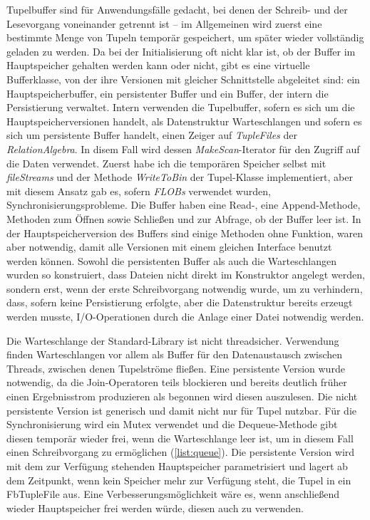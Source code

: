 \documentclass[a4paper,12pt,twoside]{article}
\newcommand{\Fb}[1]{\textit{#1}} %
\begin{document}
Tupelbuffer sind für Anwendungsfälle gedacht, bei denen der Schreib- und der Lesevorgang voneinander getrennt ist -- im Allgemeinen wird zuerst eine bestimmte Menge von Tupeln temporär gespeichert, um später wieder vollständig geladen zu werden. Da bei der Initialisierung oft nicht klar ist, ob der Buffer im Hauptspeicher gehalten werden kann oder nicht, gibt es eine virtuelle Bufferklasse, von der ihre Versionen mit gleicher Schnittstelle abgeleitet sind: ein Hauptspeicherbuffer, ein persistenter Buffer und ein Buffer, der intern die Persistierung verwaltet. Intern verwenden die Tupelbuffer, sofern es sich um die Hauptspeicherversionen handelt, als Datenstruktur Warteschlangen und sofern es sich um persistente Buffer handelt, einen Zeiger auf \Fb{TupleFiles} der \Fb{RelationAlgebra}. In disem Fall wird dessen \Fb{MakeScan}-Iterator für den Zugriff auf die Daten verwendet. Zuerst habe ich die temporären Speicher selbst mit \Fb{fileStreams} und der Methode \Fb{WriteToBin} der Tupel-Klasse implementiert, aber mit diesem Ansatz gab es, sofern \Fb{FLOBs} verwendet wurden, Synchronisierungsprobleme. Die Buffer haben eine Read-, eine Append-Methode, Methoden zum Öffnen sowie Schließen und zur Abfrage, ob der Buffer leer ist. In der Hauptspeicherversion des Buffers sind einige Methoden ohne Funktion, waren aber notwendig, damit alle Versionen mit einem gleichen Interface benutzt werden können. Sowohl die persistenten Buffer als auch die Warteschlangen wurden so konstruiert, dass Dateien nicht direkt im Konstruktor angelegt werden, sondern erst, wenn der erste Schreibvorgang notwendig wurde, um zu verhindern, dass, sofern keine Persistierung erfolgte, aber die Datenstruktur bereits erzeugt werden musste, I/O-Operationen durch die Anlage einer Datei notwendig werden.

Die Warteschlange der Standard-Library ist nicht threadsicher. Verwendung finden Warteschlangen vor allem als Buffer für den Datenaustausch zwischen Threads, zwischen denen Tupelströme fließen. Eine persistente Version wurde notwendig, da die Join-Operatoren teils blockieren und bereits deutlich früher einen Ergebnisstrom produzieren als begonnen wird diesen auszulesen. Die nicht persistente Version ist generisch und damit nicht nur für Tupel nutzbar. Für die Synchronisierung wird ein Mutex verwendet und die Dequeue-Methode gibt diesen temporär wieder frei, wenn die Warteschlange leer ist, um in diesem Fall einen Schreibvorgang zu ermöglichen (\autoref{list:queue}). Die persistente Version wird mit dem zur Verfügung stehenden Hauptspeicher parametrisiert und lagert ab dem Zeitpunkt, wenn kein Speicher mehr zur Verfügung steht, die Tupel in ein Fb{TupleFile} aus. Eine Verbesserungsmöglichkeit wäre es, wenn anschließend wieder Hauptspeicher frei werden würde, diesen auch zu verwenden.
\end{document}
